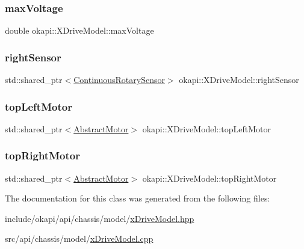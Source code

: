 \subsubsection{\texorpdfstring{maxVoltage}{maxVoltage}}
{\footnotesize\ttfamily double okapi\+::\+X\+Drive\+Model\+::max\+Voltage\hspace{0.3cm}{\ttfamily [protected]}}

\mbox{\label{classokapi_1_1XDriveModel_ab50a3276501ce448d46415361f8a422f}} 
\subsubsection{\texorpdfstring{rightSensor}{rightSensor}}
{\footnotesize\ttfamily std\+::shared\+\_\+ptr$<$\mbox{\hyperlink{classokapi_1_1ContinuousRotarySensor}{Continuous\+Rotary\+Sensor}}$>$ okapi\+::\+X\+Drive\+Model\+::right\+Sensor\hspace{0.3cm}{\ttfamily [protected]}}

\mbox{\label{classokapi_1_1XDriveModel_a7fd97da22c4f052efd49e7c7554409aa}} 
\subsubsection{\texorpdfstring{topLeftMotor}{topLeftMotor}}
{\footnotesize\ttfamily std\+::shared\+\_\+ptr$<$\mbox{\hyperlink{classokapi_1_1AbstractMotor}{Abstract\+Motor}}$>$ okapi\+::\+X\+Drive\+Model\+::top\+Left\+Motor\hspace{0.3cm}{\ttfamily [protected]}}

\mbox{\label{classokapi_1_1XDriveModel_abe393384e83737181b5b836d99b0a480}} 
\subsubsection{\texorpdfstring{topRightMotor}{topRightMotor}}
{\footnotesize\ttfamily std\+::shared\+\_\+ptr$<$\mbox{\hyperlink{classokapi_1_1AbstractMotor}{Abstract\+Motor}}$>$ okapi\+::\+X\+Drive\+Model\+::top\+Right\+Motor\hspace{0.3cm}{\ttfamily [protected]}}



The documentation for this class was generated from the following files\+:\begin{DoxyCompactItemize}
\item 
include/okapi/api/chassis/model/\mbox{\hyperlink{xDriveModel_8hpp}{x\+Drive\+Model.\+hpp}}\item 
src/api/chassis/model/\mbox{\hyperlink{xDriveModel_8cpp}{x\+Drive\+Model.\+cpp}}\end{DoxyCompactItemize}
